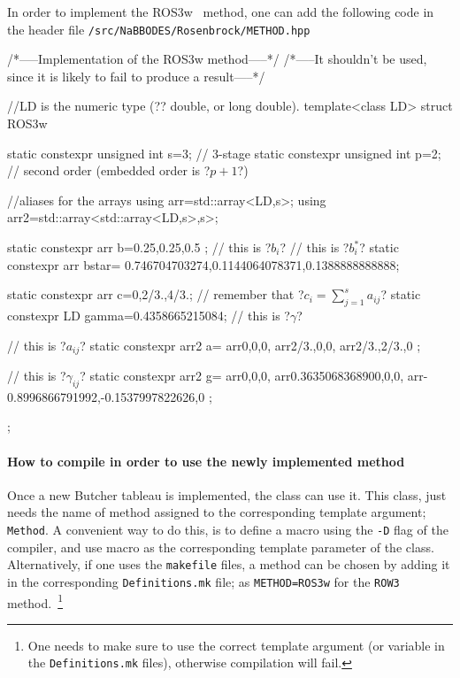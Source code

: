 \documentclass[11pt,a4paper]{article}
\begin{document}
In order to implement the ROS3w~\cite{RangAngermann2005} method, one can add the following code in the header file {\tt \mimes/src/NaBBODES/Rosenbrock/METHOD.hpp}
%
\begin{cpp}
	/*-----Implementation of the ROS3w method-----*/
	/*-----It shouldn't be used, since it is likely to fail to produce a result-----*/
	
	
	//LD is the numeric type (?\ie? double, or long double).
	template<class LD>
	struct ROS3w{
		static constexpr unsigned int s=3; // 3-stage
		static constexpr unsigned int p=2; // second order (embedded order is ?$p+1$?)
		
		//aliases for the arrays
		using arr=std::array<LD,s>;
		using arr2=std::array<std::array<LD,s>,s>;

		static constexpr arr b={0.25,0.25,0.5 };  // this is ?$b_i$?
		// this is ?$b_i^{*}$?
		static constexpr arr bstar={ 0.746704703274,0.1144064078371,0.1388888888888};  
		
		static constexpr arr c={0,2/3.,4/3.}; // remember that ?$c_i = \displaystyle\sum_{j=1}^{s} a_{ij}$?
		static constexpr LD gamma=0.4358665215084; // this is ?$\gamma$?
		
		// this is ?$a_{ij}$?
		static constexpr arr2 a={
			arr{0,0,0},
			arr{2/3.,0,0},
			arr{2/3.,2/3.,0}	
		};
	
		// this is ?$\gamma_{ij}$?	
		static constexpr arr2 g={
			arr{0,0,0},
			arr{0.3635068368900,0,0},
			arr{-0.8996866791992,-0.1537997822626,0}
		};
	};
\end{cpp}

\paragraph{How to compile \mimes in order to use the newly implemented method} Once a new Butcher tableau is implemented, the  class can use it. This class, just needs the name of method assigned to the corresponding template argument; {\tt Method}. A convenient way to do this, is to define a macro using the {\tt -D} flag of the compiler, and use macro as the corresponding template parameter of the  class. Alternatively, if one uses the {\tt makefile} files, a method can be chosen by adding it in the corresponding {\tt Definitions.mk} file; \eg as {\tt METHOD=ROS3w} for the {\tt ROW3} method.~\footnote{One needs to make sure to use the correct  template argument (or  variable in the {\tt Definitions.mk} files), otherwise compilation will fail.} 
\end{document}
